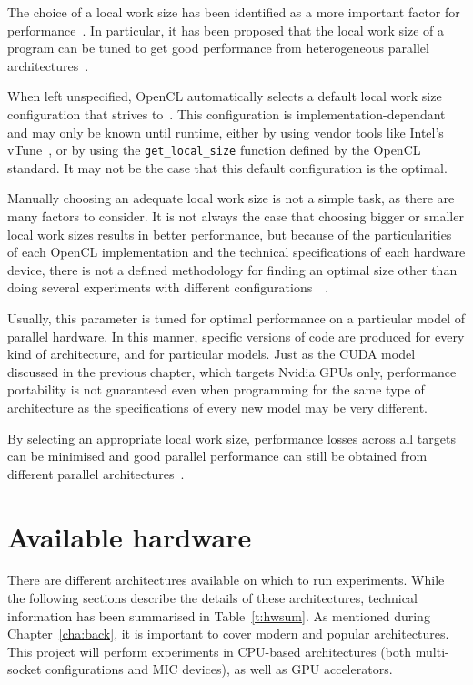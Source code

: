 The choice of a local work size has been identified as a more important factor for performance~\cite{Rosenberg2011}. In particular, it has been proposed that the local work size of a program can be tuned to get good performance from heterogeneous parallel architectures~\cite{dolbeau2013one}.

When left unspecified, OpenCL automatically selects a default local work size configuration that strives to~\cite{khronos44opencl}. This configuration is implementation-dependant and may only be known until runtime, either by using vendor tools like Intel's vTune~\cite{7_software.intel.com_2013}, or by using the \texttt{get\_local\_size} function defined by the OpenCL standard. It may not be the case that this default configuration is the optimal.

Manually choosing an adequate local work size is not a simple task, as there are many factors to consider. It is not always the case that choosing bigger or smaller local work sizes results in better performance, but because of the particularities of each OpenCL implementation and the technical specifications of each hardware device, there is not a defined methodology for finding an optimal size other than doing several experiments with different configurations~\cite{Rosenberg2011}~\cite{dolbeau2013one}.

Usually, this parameter is tuned for optimal performance on a particular model of parallel hardware. In this manner, specific versions of code are produced for every kind of architecture, and for particular models. Just as the CUDA model discussed in the previous chapter, which targets Nvidia GPUs only, performance portability is not guaranteed even when programming for the same type of architecture as the specifications of every new model may be very different.

By selecting an appropriate local work size, performance losses across all targets can be minimised and good parallel performance can still be obtained from different parallel architectures~\cite{dolbeau2013one}.

\section{Available hardware}

There are different architectures available on which to run experiments. While the following sections describe the details of these architectures, technical information has been summarised in Table~\ref{t:hwsum}. As mentioned during Chapter~\ref{cha:back}, it is important to cover modern and popular architectures. This project will perform experiments in CPU-based architectures (both multi-socket configurations and MIC devices), as well as GPU accelerators.

